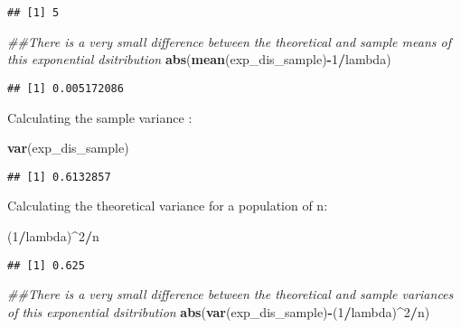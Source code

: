 \documentclass[
]{article}
\newenvironment{Shaded}{\begin{snugshade}}{\end{snugshade}}
\newcommand{\CommentTok}[1]{\textcolor[rgb]{0.56,0.35,0.01}{\textit{#1}}}
\newcommand{\DecValTok}[1]{\textcolor[rgb]{0.00,0.00,0.81}{#1}}
\newcommand{\KeywordTok}[1]{\textcolor[rgb]{0.13,0.29,0.53}{\textbf{#1}}}
\newcommand{\NormalTok}[1]{#1}
\newcommand{\OperatorTok}[1]{\textcolor[rgb]{0.81,0.36,0.00}{\textbf{#1}}}
\begin{document}
\begin{verbatim}
## [1] 5
\end{verbatim}

\begin{Shaded}
\begin{Highlighting}[]
\CommentTok{##There is a very small difference between the theoretical and sample means of this exponential dsitribution}
\KeywordTok{abs}\NormalTok{(}\KeywordTok{mean}\NormalTok{(exp_dis_sample)}\OperatorTok{-}\DecValTok{1}\OperatorTok{/}\NormalTok{lambda)}
\end{Highlighting}
\end{Shaded}

\begin{verbatim}
## [1] 0.005172086
\end{verbatim}

Calculating the sample variance :

\begin{Shaded}
\begin{Highlighting}[]
\KeywordTok{var}\NormalTok{(exp_dis_sample)}
\end{Highlighting}
\end{Shaded}

\begin{verbatim}
## [1] 0.6132857
\end{verbatim}

Calculating the theoretical variance for a population of n:

\begin{Shaded}
\begin{Highlighting}[]
\NormalTok{(}\DecValTok{1}\OperatorTok{/}\NormalTok{lambda)}\OperatorTok{^}\DecValTok{2}\OperatorTok{/}\NormalTok{n}
\end{Highlighting}
\end{Shaded}

\begin{verbatim}
## [1] 0.625
\end{verbatim}

\begin{Shaded}
\begin{Highlighting}[]
\CommentTok{##There is a very small difference between the theoretical and sample variances of this exponential dsitribution}
\KeywordTok{abs}\NormalTok{(}\KeywordTok{var}\NormalTok{(exp_dis_sample)}\OperatorTok{-}\NormalTok{(}\DecValTok{1}\OperatorTok{/}\NormalTok{lambda)}\OperatorTok{^}\DecValTok{2}\OperatorTok{/}\NormalTok{n)}
\end{Highlighting}
\end{Shaded}
\end{document}
